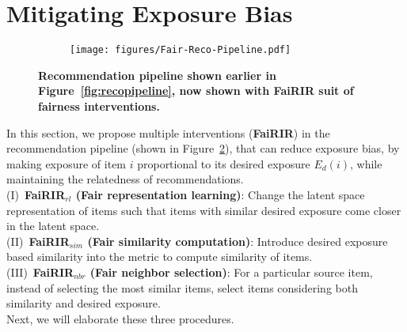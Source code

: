 \vspace{-2 mm}
\section{Mitigating Exposure Bias}
\label{sec: mitigation}

\begin{figure}[tb]
	\begin{subfigure}{\columnwidth}
		\centering
		\texttt{[image: figures/Fair-Reco-Pipeline.pdf]}
		\label{fig:pipeline}
	\end{subfigure}%
	\vspace*{-5mm}
	\caption{{\bf Recommendation pipeline shown earlier in Figure~\ref{fig:recopipeline}, now shown with FaiRIR suit of fairness interventions.}}
	\label{fig:Fairecopipeline}
	\vspace*{-5mm}
\end{figure}

In this section, %
we propose multiple interventions (\textbf{FaiRIR}) in the recommendation pipeline (shown in Figure~\ref{fig:Fairecopipeline}), that can %
reduce exposure bias, 
by making exposure of item $i$ proportional to its desired exposure %
$E_d(i)$, while maintaining the relatedness of recommendations. \\  %
(I)~{\bf FaiRIR$_{rl}$ (Fair representation learning)}: Change the latent space representation of items such that %
items with similar desired exposure come closer in the latent space. \\ %
(II)~{\bf FaiRIR$_{sim}$ (Fair similarity computation)}: Introduce desired exposure based similarity into the metric to compute similarity of items.\\
(III)~{\bf FaiRIR$_{nbr}$ (Fair neighbor selection)}: For a particular source item, instead of selecting the most similar items, %
select items considering both similarity and desired exposure. \\
Next, we will elaborate these three procedures. 


